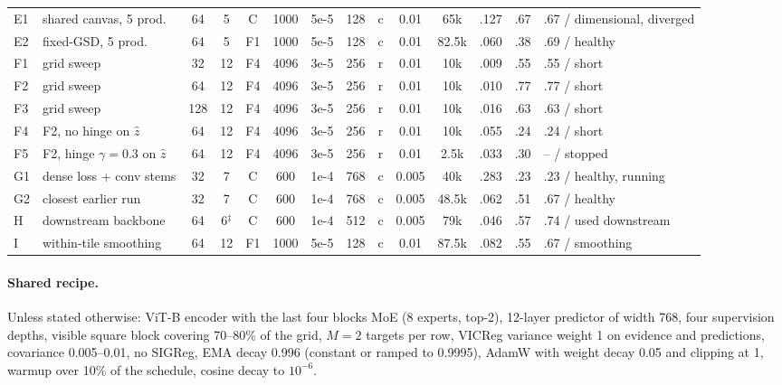 \begin{table}[t]
\begin{tabular}{@{}llcccccccccccl@{}}
    E1 & shared canvas, 5 prod.                              & 64  & 5  & C  & 1000 & 5e-5 & 128  & c & 0.01  & 65k    & .127 & .67  & .67 / dimensional, diverged \\
    E2 & fixed-GSD, 5 prod.                                  & 64  & 5  & F1 & 1000 & 5e-5 & 128  & c & 0.01  & 82.5k  & .060 & .38  & .69 / healthy \\
    F1 & grid sweep                                          & 32  & 12 & F4 & 4096 & 3e-5 & 256  & r & 0.01  & 10k    & .009 & .55  & .55 / short \\
    F2 & grid sweep                                          & 64  & 12 & F4 & 4096 & 3e-5 & 256  & r & 0.01  & 10k    & .010 & .77  & .77 / short \\
    F3 & grid sweep                                          & 128 & 12 & F4 & 4096 & 3e-5 & 256  & r & 0.01  & 10k    & .016 & .63  & .63 / short \\
    F4 & F2, no hinge on $\hat z$                            & 64  & 12 & F4 & 4096 & 3e-5 & 256  & r & 0.01  & 10k    & .055 & .24  & .24 / short \\
    F5 & F2, hinge $\gamma{=}0.3$ on $\hat z$                & 64  & 12 & F4 & 4096 & 3e-5 & 256  & r & 0.01  & 2.5k   & .033 & .30  & -- / stopped \\
    G1 & dense loss + conv stems                             & 32  & 7  & C  & 600  & 1e-4 & 768  & c & 0.005 & 40k    & .283 & .23  & .23 / healthy, running \\
    G2 & closest earlier run                                 & 32  & 7  & C  & 600  & 1e-4 & 768  & c & 0.005 & 48.5k  & .062 & .51  & .67 / healthy \\
    H  & downstream backbone                                 & 64  & 6$^\ddagger$ & C & 600 & 1e-4 & 512 & c & 0.005 & 79k & .046 & .57 & .74 / used downstream \\
    I  & within-tile smoothing                               & 64  & 12 & F1 & 1000 & 5e-5 & 128  & c & 0.01  & 87.5k  & .082 & .55  & .67 / smoothing \\
    \bottomrule
  \end{tabular}
\end{table}

\paragraph{Shared recipe.} Unless stated otherwise: ViT-B encoder with the last four blocks MoE (8 experts, top-2), 12-layer predictor of width 768, four supervision depths, visible square block covering 70--80\% of the grid, $M{=}2$ targets per row, VICReg variance weight 1 on evidence and predictions, covariance 0.005--0.01, no SIGReg, EMA decay 0.996 (constant or ramped to 0.9995), AdamW with weight decay 0.05 and clipping at 1, warmup over 10\% of the schedule, cosine decay to $10^{-6}$.

